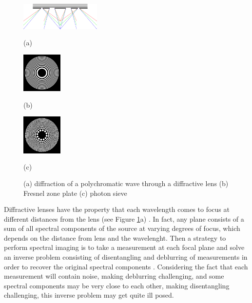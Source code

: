 \documentclass{article}
\begin{document}
\begin{figure}[htb]

\begin{minipage}[b]{0.48\linewidth}
  \centering
  \centerline{\includegraphics[width=4.0cm]{diffraction_ps_rgb}}
  \centerline{(a)}\medskip
\end{minipage}
\hfill
\begin{minipage}[b]{0.24\linewidth}
  \centering
  \centerline{\includegraphics[width=2.0cm]{zoneplate}}
  \centerline{(b)}\medskip
\end{minipage}
\hfill
\begin{minipage}[b]{0.24\linewidth}
  \centering
  \centerline{\includegraphics[width=2.0cm]{photonsieve}}
  \centerline{(c)}\medskip
\end{minipage}
\caption{(a) diffraction of a polychromatic wave through a diffractive lens (b) Fresnel zone
plate (c) photon sieve}
\label{fig:diff_lens}
%
\end{figure}

Diffractive lenses have the property that each wavelength comes to focus at
different distances from the lens (see Figure \ref{fig:diff_lens}a)
\cite{attwood2017x}. In fact, any plane consists of a sum of all spectral
components of the source at varying degrees of focus, which depends on the
distance from lens and the wavelenght. Then a strategy to perform spectral
imaging is to take a measurement at each focal plane and solve an inverse
problem consisting of disentangling and deblurring of measurements in order to
recover the original spectral components \cite{oktem2014icip}. Considering the
fact that each measurement will contain noise, making deblurring challenging,
and some spectral components may be very close to each other, making
disentangling challenging, this inverse problem may get quite ill posed.
\end{document}
